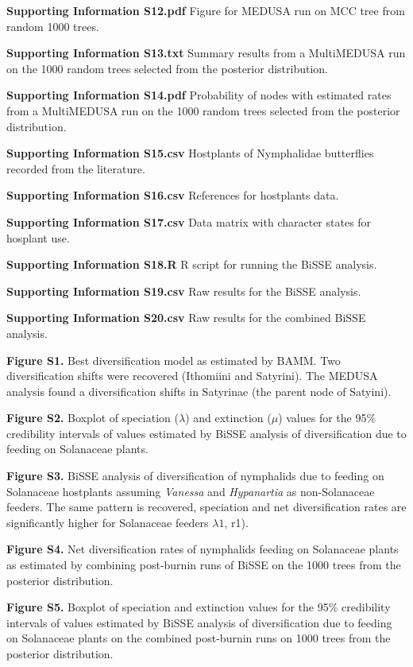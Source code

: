 \documentclass[10pt]{article}
\begin{document}
{\textbf{Supporting Information S12.pdf}} Figure for MEDUSA run on MCC
tree from random 1000 trees.

{\textbf{Supporting Information S13.txt}} Summary results from a
MultiMEDUSA run on the 1000 random trees selected from the posterior
distribution.

{\textbf{Supporting Information S14.pdf}} Probability of nodes with
estimated rates from a MultiMEDUSA run on the 1000 random trees selected
from the posterior distribution.

{\textbf{Supporting Information S15.csv}} Hostplants of Nymphalidae
butterflies recorded from the literature.

{\textbf{Supporting Information S16.csv}} References for hostplants
data.

{\textbf{Supporting Information S17.csv}} Data matrix with character
states for hosplant use.

{\textbf{Supporting Information S18.R}} R script for running the BiSSE
analysis.

{\textbf{Supporting Information S19.csv}} Raw results for the BiSSE
analysis.

{\textbf{Supporting Information S20.csv}} Raw results for the combined
BiSSE analysis.

{\textbf{Figure S1.}} Best diversification model as estimated by BAMM.
Two diversification shifts were recovered (Ithomiini and Satyrini). The
MEDUSA analysis found a diversification shifts in Satyrinae (the parent
node of Satyini).

{\textbf{Figure S2.}} Boxplot of speciation (\(\lambda\)) and extinction
(\(\mu\)) values for the 95\% credibility intervals of values estimated
by BiSSE analysis of diversification due to feeding on Solanaceae
plants.

{\textbf{Figure S3.}} BiSSE analysis of diversification of nymphalids
due to feeding on Solanaceae hostplants assuming \emph{Vanessa} and
\emph{Hypanartia} as non-Solanaceae feeders. The same pattern is
recovered, speciation and net diversification rates are significantly
higher for Solanaceae feeders \(\lambda1\), r1).

{\textbf{Figure S4.}} Net diversification rates of nymphalids feeding on
Solanaceae plants as estimated by combining post-burnin runs of BiSSE on
the 1000 trees from the posterior distribution.

{\textbf{Figure S5.}} Boxplot of speciation and extinction values for
the 95\% credibility intervals of values estimated by BiSSE analysis of
diversification due to feeding on Solanaceae plants on the combined
post-burnin runs on 1000 trees from the posterior distribution.
\end{document}
